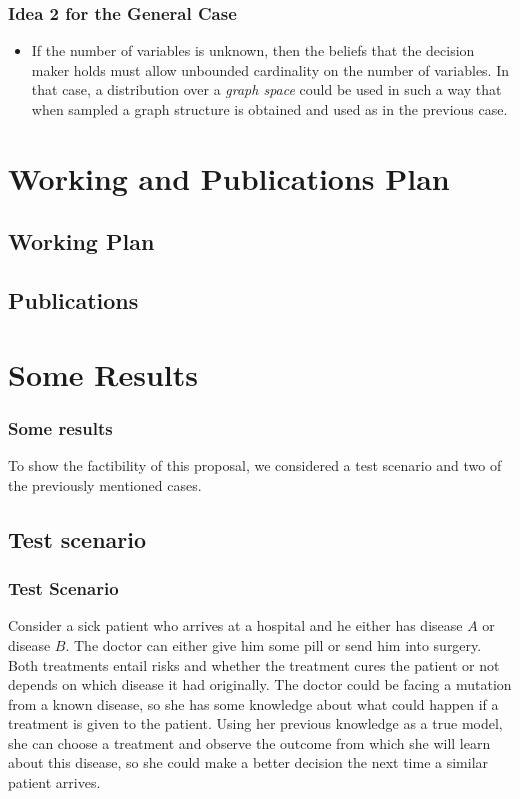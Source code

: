 \documentclass{beamer}
\theoremstyle{plain}
\begin{document}
\begin{frame}
\frametitle{Idea 2 for the General Case}
\begin{itemize}
\item If the number of variables is unknown, then the beliefs that the decision maker holds must allow unbounded cardinality on the number of variables. In that case, a distribution over a \textit{graph space} could be used in such a way that when sampled a graph structure is obtained and used as in the previous case.  
\end{itemize}
\end{frame}

\section{Working and Publications Plan}
\subsection{Working Plan}
\subsection{Publications}

\section{Some Results}
\begin{frame}
\frametitle{Some results}
To show the factibility of this proposal, we considered a test scenario and two of the previously mentioned cases.
\end{frame}
\subsection{Test scenario}
\begin{frame}
\frametitle{Test Scenario}
Consider a sick patient who arrives at a hospital and he either has disease $A$ or disease $B$. The doctor can either give him some pill or send him into surgery.  Both treatments entail risks and whether the treatment cures the patient or not depends on which disease it had originally. The doctor could be facing a mutation from a known disease, so she has some knowledge about what could happen if a treatment is given to the patient. Using her previous knowledge as a true model, she can choose a treatment and observe the outcome from which she will learn about this disease, so she could make a better decision the next time a similar patient arrives.
\end{frame}
\end{document}
